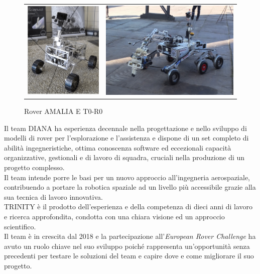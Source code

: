 \documentclass[%
corpo=11pt,
twoside,
 stile=classica,
oldstyle,
greek,%
]{toptesi}
\begin{document}
\begin{figure}
	\centering
	\begin{tabular}{ll}
		\includegraphics[width=.3\textwidth]{image/amalia.png}
&
		\includegraphics[width=.5\textwidth]{image/toro.jpg}
	\end{tabular}
		\caption{Rover AMALIA E T0-R0}
		\label{fig:amaliatoro}
	
\end{figure}

Il team DIANA ha esperienza decennale nella progettazione e nello sviluppo di modelli di rover per l'esplorazione e l'assistenza e dispone di un set completo di abilità ingegneristiche, ottima conoscenza software ed eccezionali capacità organizzative, gestionali e di lavoro di squadra, cruciali nella produzione di un progetto complesso.\\
Il team intende porre le basi per un nuovo approccio all'ingegneria aerospaziale, contribuendo a portare la robotica spaziale ad un livello più accessibile grazie alla sua tecnica di lavoro innovativa.\\
TRINITY è il prodotto dell'esperienza e della competenza di dieci anni di lavoro e ricerca approfondita, condotta con una chiara visione ed un approccio scientifico.\\
Il team è in crescita dal 2018 e la partecipazione all'\textit{European Rover Challenge} ha avuto un ruolo chiave nel suo sviluppo poiché rappresenta un'opportunità senza precedenti per testare le soluzioni del team e capire dove e come migliorare il suo progetto.
\end{document}
